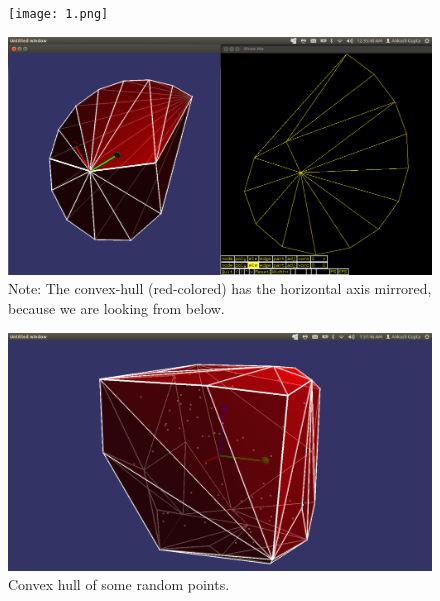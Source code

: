 \documentclass[12pt]{article}
\begin{document}
\begin{figure}[ht]
\begin{minipage}[b]{0.5\linewidth}
\centering
\texttt{[image: 1.png]}
\end{minipage}
\hspace{0.1cm}
\begin{minipage}[b]{0.5\linewidth}
\centering
\includegraphics[width=\textwidth]{spiral.png}
\end{minipage}
\caption{Note: The convex-hull (red-colored) has the horizontal axis mirrored, because we are looking from below.}
\end{figure}
\begin{figure}
  \centering
  \includegraphics[width=15cm]{rand.png}
  \caption{ Convex hull of some random points.}
\end{figure}
\end{document}

